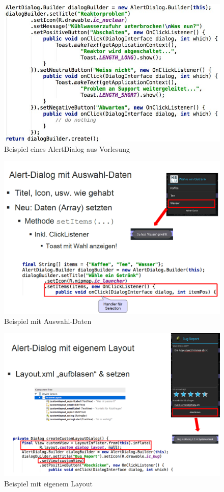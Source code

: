 \documentclass[a4paper]{article}
\begin{document}
\begin{figure}[htb!]
	\centering
	\includegraphics[width=.9\textwidth]{img/alertdialog.jpg}
	\caption{Beispiel eines AlertDialog aus Vorlesung}
\end{figure}

\newpage

\begin{figure}[htb!]
	\centering
	\includegraphics[width=\textwidth]{img/alertdialog_daten.png}
	\caption{Beispiel mit Auswahl-Daten}
\end{figure}
\begin{figure}[htb!]
	\centering
	\includegraphics[width=\textwidth]{img/alertdialog_custom.png}
	\caption{Beispiel mit eigenem Layout}
\end{figure}
\end{document}
